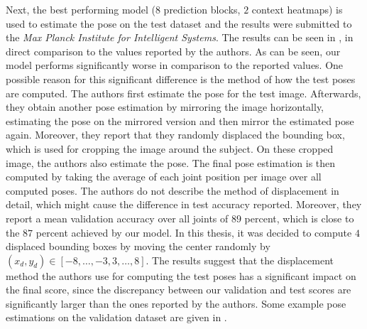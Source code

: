 Next, the best performing model ($8$ prediction blocks, $2$ context heatmaps) is used to estimate the pose on the test dataset and the results were submitted to the \textit{Max Planck Institute for Intelligent Systems}.
The results can be seen in , in direct comparison to the values reported by the authors.
As can be seen, our model performs significantly worse in comparison to the reported values.
One possible reason for this significant difference is the method of how the test poses are computed.
The authors first estimate the pose for the test image.
Afterwards, they obtain another pose estimation by mirroring the image horizontally, estimating the pose on the mirrored version and then mirror the estimated pose again.
Moreover, they report that they randomly displaced the bounding box, which is used for cropping the image around the subject.
On these cropped image, the authors also estimate the pose.
The final pose estimation is then computed by taking the average of each joint position per image over all computed poses.
The authors do not describe the method of displacement in detail, which might cause the difference in test accuracy reported.
Moreover, they report a mean validation accuracy over all joints of $89$ percent, which is close to the $87$ percent achieved by our model.
In this thesis, it was decided to compute $4$ displaced bounding boxes by moving the center randomly by $(x_d, y_d) \in [-8, \dots, -3, 3, \dots, 8]$.
The results suggest that the displacement method the authors use for computing the test poses has a significant impact on the final score, since the discrepancy between our validation and test scores are significantly larger than the ones reported by the authors.
Some example pose estimations on the validation dataset are given in .

